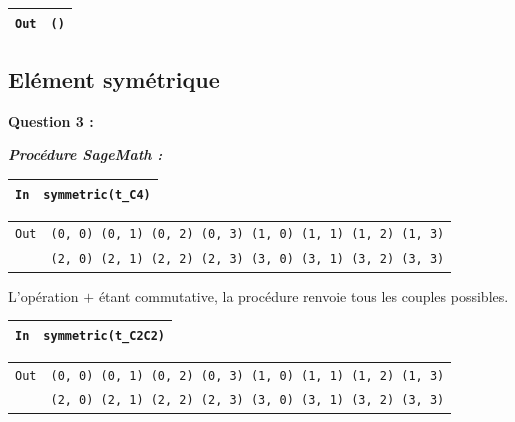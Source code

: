 \documentclass[titlepage]{article}
\begin{document}
        \begin{tabularx}{11.5cm}{|p{0.60cm}|X|}
            \hline
            \verb|Out|
            & 
            \verb|()|
            \\
            \hline
        \end{tabularx}

        \pagebreak
        \subsection{Elément symétrique}
        \textbf{Question 3 :}

        \emph{\textbf{Procédure SageMath :}}

        

        \begin{tabularx}{11.5cm}{|p{0.60cm}|X|}
            \hline
            \verb|In|
            & 
            \verb|symmetric(t_C4)|
            \\
            \hline
        \end{tabularx}

        \begin{tabularx}{11.5cm}{|p{0.60cm}|X|}
            \hline
            \verb|Out|
            & 
            \verb|(0, 0) (0, 1) (0, 2) (0, 3) (1, 0) (1, 1) (1, 2) (1, 3)|
            \\
            \verb||
            &
            \verb|(2, 0) (2, 1) (2, 2) (2, 3) (3, 0) (3, 1) (3, 2) (3, 3)|
            \\
            \hline
        \end{tabularx}\newline
        
        L'opération $+$ étant commutative, la procédure renvoie tous les couples possibles.\newline

        \begin{tabularx}{11.5cm}{|p{0.60cm}|X|}
            \hline
            \verb|In|
            & 
            \verb|symmetric(t_C2C2)|
            \\
            \hline
        \end{tabularx}

        \begin{tabularx}{11.5cm}{|p{0.60cm}|X|}
            \hline
            \verb|Out|
            & 
            \verb|(0, 0) (0, 1) (0, 2) (0, 3) (1, 0) (1, 1) (1, 2) (1, 3)|
            \\
            \verb||
            &
            \verb|(2, 0) (2, 1) (2, 2) (2, 3) (3, 0) (3, 1) (3, 2) (3, 3)|
            \\
            \hline
        \end{tabularx}\newline
        
\end{document}
